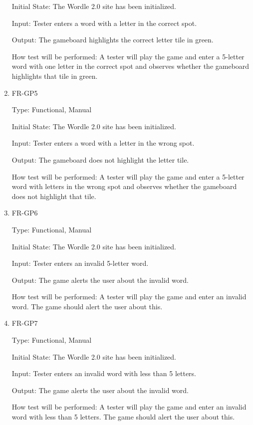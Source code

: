 \documentclass[12pt, titlepage]{article}
\begin{document}
\begin{enumerate}
Initial State: The Wordle 2.0 site has been initialized.

Input: Tester enters a word with a letter in the correct spot.

Output: The gameboard highlights the correct letter tile in green.

How test will be performed: A tester will play the game and enter a 5-letter 
word with one letter in the correct spot and observes whether the gameboard 
highlights that tile in green.

\item{FR-GP5\\}

Type: Functional, Manual

Initial State: The Wordle 2.0 site has been initialized.

Input: Tester enters a word with a letter in the wrong spot.

Output: The gameboard does not highlight the letter tile.

How test will be performed: A tester will play the game and enter a 5-letter 
word with letters in the wrong spot and observes whether the gameboard does not 
highlight that tile.

\item{FR-GP6\\}

Type: Functional, Manual

Initial State: The Wordle 2.0 site has been initialized.

Input: Tester enters an invalid 5-letter word.

Output: The game alerts the user about the invalid word.

How test will be performed: A tester will play the game and enter an invalid 
word. The game should alert the user about this.

\item{FR-GP7\\}

Type: Functional, Manual

Initial State: The Wordle 2.0 site has been initialized.

Input: Tester enters an invalid word with less than 5 letters.

Output: The game alerts the user about the invalid word.

How test will be performed: A tester will play the game and enter an invalid 
word with less than 5 letters. The game should alert the user about this.


\end{enumerate}
\end{document}
